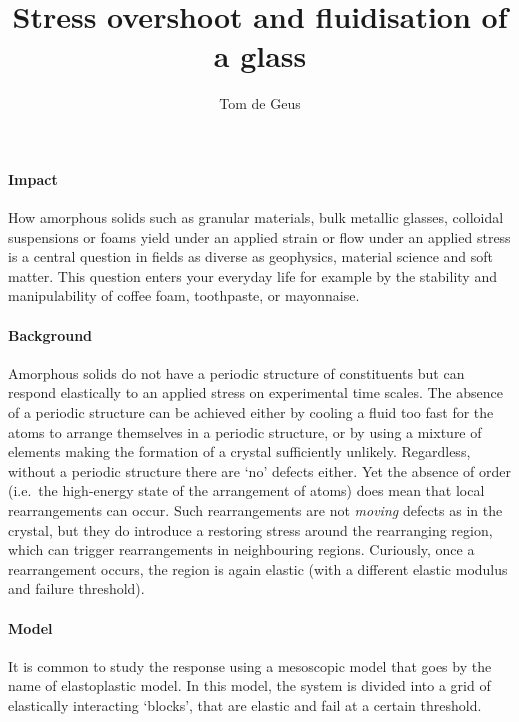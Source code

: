 \documentclass[
    pagenumbers = false,
    left = 25mm,
    right = 25mm,
    top = 30mm,
    bottom = 22mm
]{goose-article}
\title{Stress overshoot and fluidisation of a glass}
\author{Tom de Geus}
\begin{document}
\twocolumn[
    \begin{@twocolumnfalse}
        \maketitle
    \end{@twocolumnfalse}
]
\sloppy

\paragraph{Impact}

How amorphous solids such as granular materials, bulk metallic glasses, colloidal suspensions or foams yield under an applied strain or flow under an applied stress is a central question in fields as diverse as geophysics, material science and soft matter.
This question enters your everyday life for example by the stability and manipulability of coffee foam, toothpaste, or mayonnaise.

\paragraph{Background}

Amorphous solids do not have a periodic structure of constituents but can respond elastically to an applied stress on experimental time scales.
The absence of a periodic structure can be achieved either by cooling a fluid too fast for the atoms to arrange themselves in a periodic structure, or by using a mixture of elements making the formation of a crystal sufficiently unlikely.
Regardless, without a periodic structure there are `no' defects either.
Yet the absence of order (i.e.\ the high-energy state of the arrangement of atoms) does mean that local rearrangements can occur.
Such rearrangements are not \emph{moving} defects as in the crystal, but they do introduce a restoring stress around the rearranging region, which can trigger rearrangements in neighbouring regions.
Curiously, once a rearrangement occurs, the region is again elastic (with a different elastic modulus and failure threshold).

\paragraph{Model}

It is common to study the response using a mesoscopic model that goes by the name of elastoplastic model.
In this model, the system is divided into a grid of elastically interacting `blocks', that are elastic and fail at a certain threshold.
\end{document}
